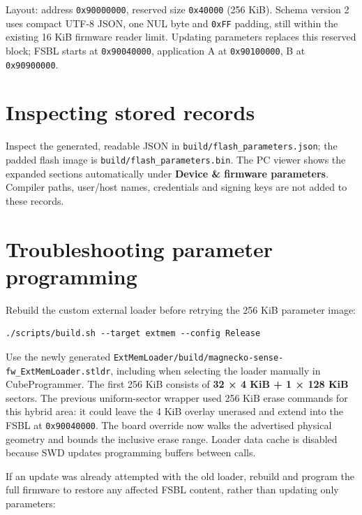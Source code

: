 \documentclass[10pt,a4paper,oneside]{report}
\begin{document}
Layout: address \texttt{0x90000000}, reserved size \texttt{0x40000} (256 KiB). Schema version 2 uses compact UTF-8 JSON, one NUL byte and \texttt{0xFF} padding, still within the existing 16 KiB firmware reader limit. Updating parameters replaces this reserved block; FSBL starts at \texttt{0x90040000}, application A at \texttt{0x90100000}, B at \texttt{0x90900000}.

\section{Inspecting stored records}\label{wiki-firmware-parameters--inspecting-stored-records}

Inspect the generated, readable JSON in \texttt{build/\allowbreak{}flash\_\allowbreak{}parameters.\allowbreak{}json}; the padded flash image is \texttt{build/\allowbreak{}flash\_\allowbreak{}parameters.\allowbreak{}bin}. The PC viewer shows the expanded sections automatically under \textbf{Device \& firmware parameters}. Compiler paths, user/host names, credentials and signing keys are not added to these records.

\section{Troubleshooting parameter programming}\label{wiki-firmware-parameters--troubleshooting-parameter-programming}

Rebuild the custom external loader before retrying the 256 KiB parameter image:

\begin{verbatim}
./scripts/build.sh --target extmem --config Release
\end{verbatim}

Use the newly generated \texttt{ExtMemLoader/\allowbreak{}build/\allowbreak{}magnecko-\allowbreak{}sense-\allowbreak{}fw\_\allowbreak{}ExtMemLoader.\allowbreak{}stldr}, including when selecting the loader manually in CubeProgrammer. The first 256 KiB consists of \textbf{32 × 4 KiB + 1 × 128 KiB} sectors. The previous uniform-sector wrapper used 256 KiB erase commands for this hybrid area: it could leave the 4 KiB overlay unerased and extend into the FSBL at \texttt{0x90040000}. The board override now walks the advertised physical geometry and bounds the inclusive erase range. Loader data cache is disabled because SWD updates programming buffers between calls.

If an update was already attempted with the old loader, rebuild and program the full firmware to restore any affected FSBL content, rather than updating only parameters:
\end{document}
